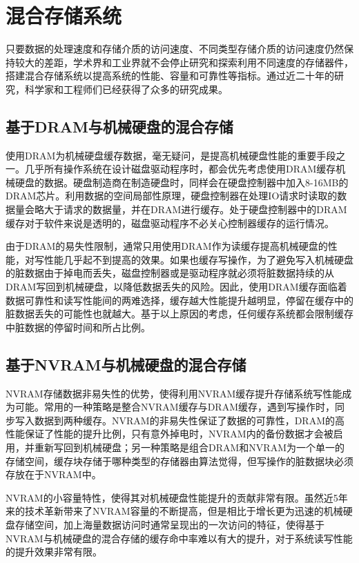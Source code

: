 \section{混合存储系统}
\label{sec:hybrid_storage}

只要数据的处理速度和存储介质的访问速度、不同类型存储介质的访问速度仍然保持较大的差距，学术界和工业界就不会停止研究和探索利用不同速度的存储器件，搭建混合存储系统\cite{zhuqing2013hybrid}以提高系统的性能、容量和可靠性等指标。通过近二十年的研究，科学家和工程师们已经获得了众多的研究成果。

\subsection{基于DRAM与机械硬盘的混合存储}

使用DRAM为机械硬盘缓存数据\cite{sdramcache2002}，毫无疑问，是提高机械硬盘性能的重要手段之一。几乎所有操作系统在设计磁盘驱动程序时，都会优先考虑使用DRAM缓存机械硬盘的数据。硬盘制造商在制造硬盘时，同样会在硬盘控制器中加入8-16MB的DRAM芯片。利用数据的空间局部性原理，硬盘控制器在处理IO请求时读取的数据量会略大于请求的数据量，并在DRAM进行缓存。处于硬盘控制器中的DRAM缓存对于软件来说是透明的，磁盘驱动程序不必关心控制器缓存的运行情况。

由于DRAM的易失性限制，通常只用使用DRAM作为读缓存提高机械硬盘的性能，对写性能几乎起不到提高的效果。如果也缓存写操作，为了避免写入机械硬盘的脏数据由于掉电而丢失，磁盘控制器或是驱动程序就必须将脏数据持续的从DRAM写回到机械硬盘，以降低数据丢失的风险。因此，使用DRAM缓存面临着数据可靠性和读写性能间的两难选择，缓存越大性能提升越明显，停留在缓存中的脏数据丢失的可能性也就越大。基于以上原因的考虑，任何缓存系统都会限制缓存中脏数据的停留时间和所占比例。

\subsection{基于NVRAM与机械硬盘的混合存储}

NVRAM存储数据非易失性的优势，使得利用NVRAM缓存提升存储系统写性能成为可能。常用的一种策略是整合NVRAM缓存与DRAM缓存\cite{nvramcache2013}，遇到写操作时，同步写入数据到两种缓存。NVRAM的非易失性保证了数据的可靠性，DRAM的高性能保证了性能的提升比例，只有意外掉电时，NVRAM内的备份数据才会被启用，并重新写回到机械硬盘；另一种策略是组合DRAM和NVRAM为一个单一的存储空间，缓存块存储于哪种类型的存储器由算法觉得，但写操作的脏数据块必须存放在于NVRAM中。

NVRAM的小容量特性，使得其对机械硬盘性能提升的贡献非常有限。虽然近5年来的技术革新带来了NVRAM容量的不断提高，但是相比于增长更为迅速的机械硬盘存储空间，加上海量数据访问时通常呈现出的一次访问的特征，使得基于NVRAM与机械硬盘的混合存储的缓存命中率难以有大的提升，对于系统读写性能的提升效果非常有限。

